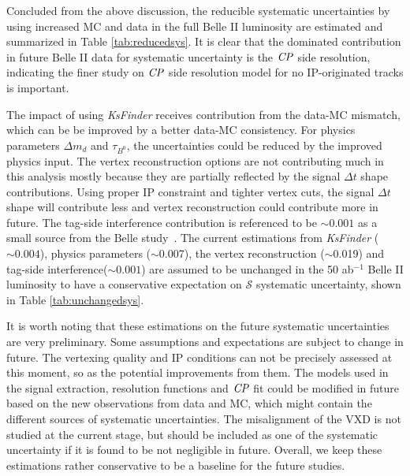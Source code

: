Concluded from the above discussion, the reducible systematic uncertainties by using increased MC and data in the full Belle II luminosity are estimated and summarized in Table \ref{tab:reducedsys}. It is clear that the dominated contribution in future Belle II data for systematic uncertainty is the $\it{CP}$ side resolution, indicating the finer study on $\it{CP}$ side resolution model for no IP-originated tracks is important.

The impact of using \textit{KsFinder} receives contribution from the data-MC mismatch, which can be be improved by a better data-MC consistency. For physics parameters $\Delta m_d$ and $\tau_{B^0}$, the uncertainties could be reduced by the improved physics input. The vertex reconstruction options are not contributing much in this analysis mostly because they are partially reflected by the signal $\Delta t$ shape contributions. Using proper IP constraint and tighter vertex cuts, the signal $\Delta t$ shape will contribute less and vertex reconstruction could contribute more in future. The tag-side interference contribution is referenced to be $\sim0.001$ as a small source from the Belle study~\cite{yosuke2011measurement}.   The current estimations from \textit{KsFinder} ($\sim0.004$), physics parameters ($\sim$0.007), the vertex reconstruction ($\sim$0.019) and tag-side interference($\sim0.001$) are assumed to be unchanged in the 50 ab$^{-1}$ Belle II luminosity to have a conservative expectation on $\mathcal{S}$ systematic uncertainty, shown in Table \ref{tab:unchangedsys}. 

It is worth noting that these estimations on the future systematic uncertainties are very preliminary. Some assumptions and expectations are subject to change in future. The vertexing quality and IP conditions can not be precisely assessed at this moment, so as the potential improvements from them. The models used in the signal extraction, resolution functions and $\it{CP}$ fit could be modified in future based on the new observations from data and MC, which might contain the different sources of systematic uncertainties. The misalignment of the VXD is not studied at the current stage, but should be included as one of the systematic uncertainty if it is found to be not negligible in future. Overall, we keep these estimations rather conservative to be a baseline for the future studies.
 

